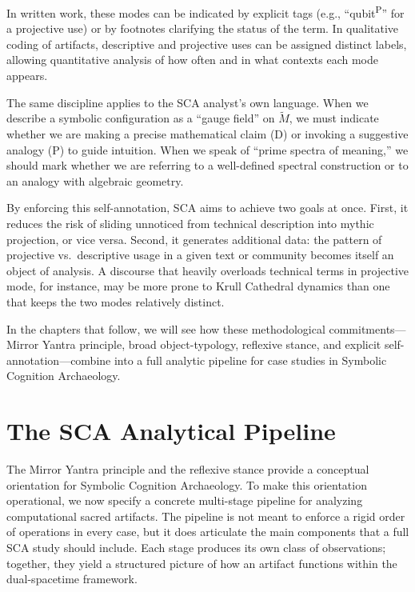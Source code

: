 \documentclass[12]{amsart}
\theoremstyle{plain}
\begin{document}
In written work, these modes can be indicated by explicit tags (e.g., ``qubit\textsuperscript{\textsc{P}}'' for a projective use) or by footnotes clarifying the status of the term. In qualitative coding of artifacts, descriptive and projective uses can be assigned distinct labels, allowing quantitative analysis of how often and in what contexts each mode appears.

The same discipline applies to the SCA analyst's own language. When we describe a symbolic configuration as a ``gauge field'' on $\tilde M$, we must indicate whether we are making a precise mathematical claim (\textsc{D}) or invoking a suggestive analogy (\textsc{P}) to guide intuition. When we speak of ``prime spectra of meaning,'' we should mark whether we are referring to a well-defined spectral construction or to an analogy with algebraic geometry.

By enforcing this self-annotation, SCA aims to achieve two goals at once. First, it reduces the risk of sliding unnoticed from technical description into mythic projection, or vice versa. Second, it generates additional data: the pattern of projective vs.\ descriptive usage in a given text or community becomes itself an object of analysis. A discourse that heavily overloads technical terms in projective mode, for instance, may be more prone to Krull Cathedral dynamics than one that keeps the two modes relatively distinct.

In the chapters that follow, we will see how these methodological commitments—Mirror Yantra principle, broad object-typology, reflexive stance, and explicit self-annotation—combine into a full analytic pipeline for case studies in Symbolic Cognition Archaeology.

\section{The SCA Analytical Pipeline}

The Mirror Yantra principle and the reflexive stance provide a conceptual orientation for Symbolic Cognition Archaeology. To make this orientation operational, we now specify a concrete multi-stage pipeline for analyzing computational sacred artifacts. The pipeline is not meant to enforce a rigid order of operations in every case, but it does articulate the main components that a full SCA study should include. Each stage produces its own class of observations; together, they yield a structured picture of how an artifact functions within the dual-spacetime framework.
\end{document}
